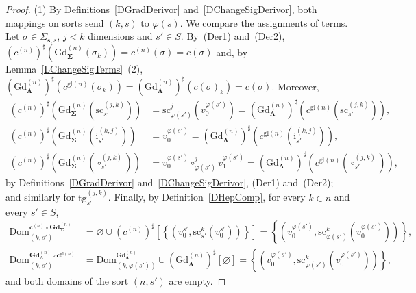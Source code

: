 \documentclass[a4paper, reqno
]{amsart}
\newcommand{\sig}[1]{\mathbf{#1}}             %
\newcommand{\Dom}{\mathrm{Dom}}
\newcommand{\gl}{\mathrm{gl}}                %
\newcommand{\src}{\mathrm{sc}}
\newcommand{\tgt}{\mathrm{tg}}
\newcommand{\Gd}{\mathrm{Gd}}
\newcommand{\bGd}{\mathbf{Gd}}
\theoremstyle{plain}
\theoremstyle{definition}
\begin{document}
\begin{proof}
(1) By Definitions~\ref{DGradDerivor} and~\ref{DChangeSigDerivor}, both mappings on sorts send $(k,s)$ to $\varphi(s)$.
We compare the assignments of terms.
Let $\sigma\in\Sigma_{\mathbf{s},s}$, $j<k$ dimensions and $s'\in S$.
By~(Der1) and~(Der2), $(c^{(n)})^{\sharp}(\Gd^{(n)}_{\sig{\Sigma}}(\sigma_{k}))=c^{(n)}(\sigma)=c(\sigma)$ and, by Lemma~\ref{LChangeSigTerms}~(2), $(\Gd^{(n)}_{\sig{\Lambda}})^{\sharp}(c^{\gl(n)}(\sigma_{k}))=(\Gd^{(n)}_{\sig{\Lambda}})^{\sharp}(c(\sigma)_{k})=c(\sigma)$.
Moreover,
\begin{align*}
(c^{(n)})^{\sharp}\left(\Gd^{(n)}_{\sig{\Sigma}}(\src^{(j,k)}_{s'})\right)
&=
\src^{j}_{\varphi(s')}\left(v^{\varphi(s')}_{0}\right)
=
(\Gd^{(n)}_{\sig{\Lambda}})^{\sharp}\left(c^{\gl(n)}(\src^{(j,k)}_{s'})\right),
\\
(c^{(n)})^{\sharp}\left(\Gd^{(n)}_{\sig{\Sigma}}(\mathrm{i}^{(k,j)}_{s'})\right)
&=
v^{\varphi(s')}_{0}
=
(\Gd^{(n)}_{\sig{\Lambda}})^{\sharp}\left(c^{\gl(n)}(\mathrm{i}^{(k,j)}_{s'})\right),
\\
(c^{(n)})^{\sharp}\left(\Gd^{(n)}_{\sig{\Sigma}}(\circ^{(j,k)}_{s'})\right)
&=
v^{\varphi(s')}_{0}\circ^{j}_{\varphi(s')}v^{\varphi(s')}_{1}
=
(\Gd^{(n)}_{\sig{\Lambda}})^{\sharp}\left(c^{\gl(n)}(\circ^{(j,k)}_{s'})\right),
\end{align*}
by Definitions~\ref{DGradDerivor} and~\ref{DChangeSigDerivor}, (Der1) and~(Der2); and similarly for $\tgt^{(j,k)}_{s'}$.
Finally, by Definition~\ref{DHepComp}, for every $k\in n$ and every $s'\in S$,
\begin{align*}
\Dom^{\mathbf{c}^{(n)}\circ\bGd^{(n)}_{\sig{\Sigma}}}_{(k,s')}
&=
\varnothing\cup(c^{(n)})^{\sharp}\left[\left\lbrace\left(v^{s'}_{0},\src^{k}_{s'}(v^{s'}_{0})\right)\right\rbrace\right]
=
\left\lbrace\left(v^{\varphi(s')}_{0},\src^{k}_{\varphi(s')}(v^{\varphi(s')}_{0})\right)\right\rbrace,
\\
\Dom^{\bGd^{(n)}_{\sig{\Lambda}}\circ\mathbf{c}^{\gl(n)}}_{(k,s')}
&=
\Dom^{\Gd^{(n)}_{\sig{\Lambda}}}_{(k,\varphi(s'))}\cup(\Gd^{(n)}_{\sig{\Lambda}})^{\sharp}[\varnothing]
=
\left\lbrace\left(v^{\varphi(s')}_{0},\src^{k}_{\varphi(s')}(v^{\varphi(s')}_{0})\right)\right\rbrace,
\end{align*}
and both domains of the sort $(n,s')$ are empty.


\end{proof}
\end{document}
